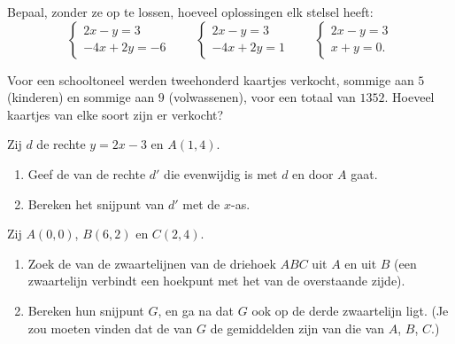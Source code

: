 \begin{exercise}[$\star\star$]\label{exo:g10:lines:7}
Bepaal, zonder ze op te lossen, hoeveel oplossingen elk stelsel heeft:
\[
\begin{cases}
2x - y = 3 \\
-4x + 2y = -6
\end{cases}
\qquad
\begin{cases}
2x - y = 3 \\
-4x + 2y = 1
\end{cases}
\qquad
\begin{cases}
2x - y = 3 \\
x + y = 0 .
\end{cases}
\]
\end{exercise}

\begin{exercise}[$\star\star$]\label{exo:g10:lines:8}
Voor een schooltoneel werden tweehonderd kaartjes verkocht, sommige aan $5$
(kinderen) en sommige aan $9$ (volwassenen), voor een totaal van $1352$.
Hoeveel kaartjes van elke soort zijn er verkocht?
\end{exercise}

\begin{exercise}[$\star\star$]\label{exo:g10:lines:9}
Zij $d$ de rechte $y = 2x - 3$ en $A(1, 4)$.
\begin{enumerate}
  \item Geef de  van de rechte $d'$ die evenwijdig is met $d$ en
        door $A$ gaat.
  \item Bereken het snijpunt van $d'$ met de $x$-as.
\end{enumerate}
\end{exercise}

\begin{exercise}[$\star\star\star$]\label{exo:g10:lines:10}
Zij $A(0, 0)$, $B(6, 2)$ en $C(2, 4)$.
\begin{enumerate}
  \item Zoek de  van de zwaartelijnen van de driehoek $ABC$ uit
        $A$ en uit $B$ (een zwaartelijn verbindt een hoekpunt met het 
        van de overstaande zijde).
  \item Bereken hun snijpunt $G$, en ga na dat $G$ ook op de derde
        zwaartelijn ligt. (Je zou moeten vinden dat de  van $G$ de
        gemiddelden zijn van die van $A$, $B$, $C$.)
\end{enumerate}
\end{exercise}

